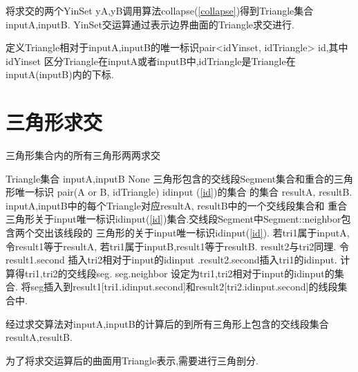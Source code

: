 \documentclass[a4paper]{book}
\renewcommand{\algorithmicrequire}{\textbf{输入:}}
\renewcommand{\algorithmicensure}{\textbf{输出:}}
\renewcommand{\algorithmicrequire}{\textbf{Input : }}
\renewcommand{\algorithmicrequire}{\textbf{Precondition : }}
\renewcommand{\algorithmicensure}{\textbf{Output : }}
\renewcommand{\algorithmicensure}{\textbf{Postcondition : }}
\numberwithin{equation}{chapter}
\theoremstyle{definition}
\begin{document}
将求交的两个YinSet yA,yB调用算法collapse(\ref{collapse})得到Triangle集合inputA,inputB.
YinSet交运算通过表示边界曲面的Triangle求交进行.

 \label{id} 定义Triangle相对于inputA,inputB的唯一标识pair<idYinset, idTriangle> id,其中idYinset
区分Triangle在inputA或者inputB中,idTriangle是Triangle在inputA(inputB)内的下标.

\section{三角形求交}
\begin{algorithm}\label{TriangleIntersection}
	\caption{三角形集合内的所有三角形两两求交}
	\begin{algorithmic}[1]
		\renewcommand{\algorithmicrequire}{\textbf{Input : }}
		\Require Triangle集合 inputA,inputB
		\renewcommand{\algorithmicrequire}{\textbf{Precondition : }}
		\Require None
		\renewcommand{\algorithmicensure}{\textbf{Output : }}
            \Ensure 三角形包含的交线段Segment集合和重合的三角形唯一标识
        pair(A or B, idTriangle) idinput (\ref{id})的集合 的集合
        resultA, resultB.
		\renewcommand{\algorithmicensure}{\textbf{Postcondition : }}
		\Ensure inputA,inputB中的每个Triangle对应resultA, resultB中的一个交线段集合和
        重合三角形关于input唯一标识idinput(\ref{id})集合.交线段Segment中Segment::neighbor包含两个交出该线段的
        三角形的关于input唯一标识idinput(\ref{id}).
        \State 若tri1属于inputA,令result1等于resultA, 若tri1属于inputB,result1等于resultB.
        \State result2与tri2同理. 
        \State 令result1.second 插入tri2相对于input的idinput
        .result2.second插入tri1的idinput.
        \Else
        \State 计算得tri1,tri2的交线段seg.
        \State seg.neighbor 设定为tri1,tri2相对于input的idinput的集合.
        \State 将seg插入到result1[tri1.idinput.second]和result2[tri2.idinput.second]的线段集合中.
        \EndIf
        \EndFor
		\EndFunction
	\end{algorithmic}
\end{algorithm}

经过求交算法对inputA,inputB的计算后的到所有三角形上包含的交线段集合resultA,resultB.

为了将求交运算后的曲面用Triangle表示,需要进行三角剖分.
\end{document}
